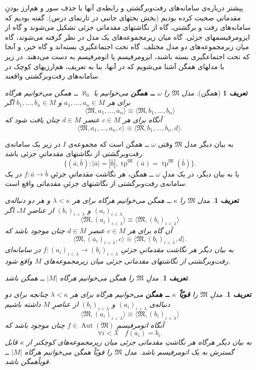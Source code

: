 \documentclass[12pt,a4paper]{report}
\theoremstyle{colorhead}
\newtheorem{defn}[thm]{تعریف}
\DeclareMathOperator{\tp}{tp}
\DeclareMathOperator{\Aut}{Aut}
\begin{document}
  پیشتر درباره‌ی سامانه‌های رفت‌وبرگشتی و رابطه‌ی آنها با حذف سور و 
  هم‌ارز بودنِ مقدماتی صحبت کرده‌ بودیم (بخش بحثهای جانبی در تارنمای درس).
  گفته بودیم که سامانه‌های رفت و برگشتی، گاه
  از نگاشتهای مقدماتی جزئی تشکیل می‌شوند و گاه از ایزومرفیسمهای جزئی. گاه میان زیرمجموعه‌های یک مدل در نظر گرفته می‌شوند، گاه میان زیرمجموعه‌های دو مدل مختلف. گاه تحت اجتماعگیری بسته‌اند و گاه خیر،‌ و آنجا که تحت اجتماعگیری بسته باشند، ایزومرفیسم یا اتومرفیسم به دست می‌دهند. در زیر با مدلهای همگن آشنا می‌شویم که در‌ آنها، بنا به تعریف، هم‌ارزیهای کوچک در سامانه‌های رفت‌وبرگشتی واقعند. 
\begin{defn}[همگن]
مدل
$\mathfrak{M}$
را 
\textbf{$\omega$
ــ
همگن
}
می‌خوانیم یا
$\aleph_0$
ــ
همگن می‌خوانیم هرگاه برای هر
$a_1,\ldots, a_n\in M$
و 
$b_1,\ldots,b_n\in M$
اگر
\[
\langle \mathfrak{M},a_1,\ldots,a_n\rangle \equiv \langle \mathfrak{M},b_1,\ldots,b_n\rangle
\]
آنگاه برای هر
$c\in M$
عنصر
$d\in M$
چنان یافت شود که
\[
\langle\mathfrak{M},a_1,\ldots,a_n,c\rangle \equiv \langle \mathfrak{M},b_1,\ldots,b_n, d\rangle.
\]
\end{defn}
به بیان دیگر مدل
$\mathfrak{M}$
وقتی
$\omega$
ــ
همگن است که مجموعه‌ی
$I$
در زیر یک سامانه‌ی رفت‌وبرگشتی از نگاشتهای مقدماتیِ جزئی باشد:
\[
\{(\bar{a},\bar{b}):|\bar{a}|=|\bar{b}|,  \tp^\mathfrak{M}(\bar{a})= \tp^\mathfrak{M}(\bar{b})\}.
\]
یا به بیان دیگر، در یک مدلِ
$\omega$
ــ
همگن، هر نگاشت مقدماتیِ جزئیِ
$f:\bar{a}\to \bar{b}$
در یک سامانه‌ی رفت‌وبرگشتی از نگاشتهای جزئیِ مقدماتی واقع است.
\begin{defn}
مدل
$\mathfrak{M}$
را
$\kappa$
ــ
همگن می‌خوانیم هرگاه برای هر
$\lambda<\kappa$
و هر
دو دنباله‌ی
$(a_i)_{i<\lambda}$
و
$(b_i)_{i<\lambda}$
از عناصرِ
$M$،
اگر
\[
\langle \mathfrak{M},(a_i)_{i<\lambda}\rangle \equiv \langle \mathfrak{M},(b_i)_{i<\lambda}\rangle
\]
آن گاه برای هر
$c\in M$
عنصر
$d\in M$
چنان موجود باشد که 
\[
\langle \mathfrak{M},(a_i)_{i<\lambda},c\rangle \equiv \langle \mathfrak{M},(b_i)_{i<\lambda},d\rangle.
\]
به بیان دیگر هر نگاشت مقدماتیِ
جزئیِ
$f:(a_i)_{i<\lambda}\to (b_i)_{i<\lambda}$
در سامانه‌ای رفت‌وبرگشتی از نگاشتهای مقدماتی جزئی میان زیرمجموعه‌های
$M$
واقع شود.
\end{defn}
\begin{defn}
مدلِ
$\mathfrak{M}$
را همگن می‌خوانیم هرگاه
$|M|$
ــ
همگن باشد.
\end{defn}
\begin{defn}
مدلِ
$\mathfrak{M}$
را
\textbf{ قویّاً 
$\kappa$
ــ
همگن }
می‌خوانیم هرگاه برای هر
$\lambda<\kappa$
چنانچه برای دو دنباله‌ی
$(a_i)_{i<\lambda}$
و
$(b_i)_{i<\lambda}$
از عناصرِ
$M$
داشته باشیم
\[
\langle \mathfrak{M},(a_i)_{i<\lambda}\rangle \equiv 
\langle \mathfrak{M},(b_i)_{i<\lambda}\rangle 
\]
آنگاه اتومرفیسمِ
$f\in \Aut(\mathfrak{M})$
چنان موجود باشد که
\[
\forall i<\lambda \quad f(a_i)=b_i.
\]
به بیان دیگر هرگاه هر نگاشتِ 
مقدماتی جزئی میان زیرمجموعه‌های کوچکتر از
$\kappa$
قابل گسترش به یک اتومرفیسم باشد. مدل
$\mathfrak{M}$
را قویّاً همگن می‌خوانیم هرگاه
$|M|$
ــ
قویاً‌همگن باشد.
\end{defn}
\end{document}
